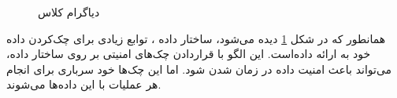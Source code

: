 \begin{figure}[h!]
\caption{دیاگرام کلاس }
\label{safeSmartDataClassDiag}
\end{figure}
\begin{RTL}
همانطور که در شکل \ref{safeSmartDataClassDiag}
دیده می‌شود، ساختار داده ، توابع زیادی برای
چک‌کردن داده خود به  ارائه داده‌است.
این الگو با قراردادن چک‌های امنیتی بر روی ساختار داده، می‌تواند باعث امنیت
داده در زمان شدن شود. اما این چک‌ها خود سرباری برای انجام هر عملیات
با این داده‌ها می‌شوند.
\end{RTL}
